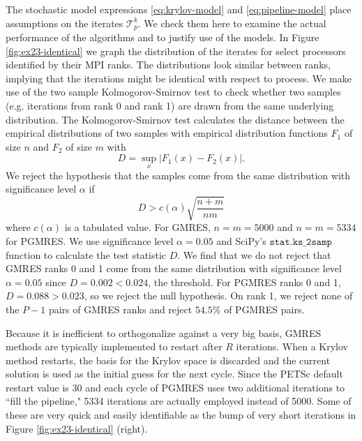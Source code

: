 \documentclass[sigconf]{acmart}
\begin{document}
The stochastic model expressions \eqref{eq:krylov-model} and \eqref{eq:pipeline-model} place assumptions on the iterates $\mathcal{T}^k_p$. We check them here to examine the actual performance of the algorithms and to justify use of the models. 
In Figure \ref{fig:ex23-identical} we graph the distribution of the iterates for select processors identified by their MPI ranks. The distributions look similar between ranks, implying that the iterations might be identical with respect to process. We make use of the two sample Kolmogorov-Smirnov test to check whether two samples (e.g. iterations from rank 0 and rank 1) are drawn from the same underlying distribution. The Kolmogorov-Smirnov test calculates the distance between the empirical distributions of two samples with empirical distribution functions $F_1$ of size $n$ and $F_2$ of size $m$ with
$$ D = \sup_x |F_1(x) - F_2(x)|. $$
We reject the hypothesis that the samples come from the same distribution with significance level $\alpha$ if 
$$D > c(\alpha)\sqrt{\frac{n + m}{nm}}$$
where $c(\alpha)$ is a tabulated value. 
For GMRES, $n = m = 5000$ and $n = m = 5334$ for PGMRES. We use significance level $\alpha = 0.05$ and SciPy's ${\texttt{stat.ks\_2samp}}$ function to calculate the test statistic $D$.  
We find that we do not reject that GMRES ranks 0 and 1 come from the same distribution with significance level $\alpha = 0.05$ since $D = 0.002 < 0.024$, the threshold. For PGMRES ranks 0 and 1, $D = 0.088 > 0.023$, so we reject the null hypothesis. 
On rank 1, we reject none of the $P-1$ pairs of GMRES ranks and reject $54.5\%$ of PGMRES pairs.

Because it is inefficient to orthogonalize against a very big basis, GMRES methods are typically implemented to restart after $R$ iterations. When a Krylov method restarts, the basis for the Krylov space is discarded and the current solution is used as the initial guess for the next cycle.
Since the PETSc default restart value is $30$ and each cycle of PGMRES uses two additional iterations to ``fill the pipeline," 5334 iterations are actually employed instead of 5000. Some of these are very quick and easily identifiable as the bump of very short iterations in Figure \ref{fig:ex23-identical} (right). 
\end{document}
